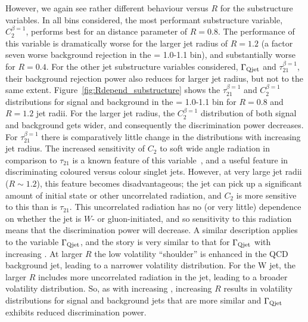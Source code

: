However, we again see rather
different behaviour versus $R$ for the substructure variables. In all \pt bins
considered, the most performant substructure variable, $C_2^{\beta=1}$,
performs best for an \antikt distance parameter of $R=0.8$. The
performance of this variable is dramatically worse for the larger jet
radius of $R=1.2$ (a factor seven worse background rejection in
the \pt = 1.0-1.1 \TeV bin), and substantially worse for $R=0.4$. For the other
jet substructure variables considered, $\Gamma_{\rm Qjet}$ and
$\tau_{21}^{\beta=1}$, their background rejection
power also reduces for larger jet radius, but not to the same
extent. Figure~\ref{fig:Rdepend_substructure} shows the
$\tau_{21}^{\beta=1}$ and $C_2^{\beta=1}$ distributions for signal and
background in the \pt = 1.0-1.1 \TeV bin for $R=0.8$ and $R=1.2$ jet
radii. For the larger jet radius, the
$C_2^{\beta=1}$  distribution of both signal and background gets wider,
and consequently the discrimination power decreases. For
$\tau_{21}^{\beta=1}$ there is comparatively little change in the distributions
with increasing jet radius. The increased sensitivity of $C_{2}$ to
soft wide angle radiation in comparison to $\tau_{21}$ is a known
feature of this variable~\cite{Larkoski:2013eya}, and a useful feature
in discriminating coloured versus colour singlet jets. However, at
very large jet radii ($R\sim1.2$), this feature becomes
disadvantageous; the jet can pick up a significant amount of initial
state or other uncorrelated radiation, and $C_{2}$ is more sensitive
to this than is $\tau_{21}$.  This uncorrelated radiation has no (or
very little) dependence on whether the jet is $W$- or gluon-initiated, and so sensitivity to this radiation means that the 
discrimination power will decrease. A similar description applies to the 
variable $\Gamma_{\rm Qjet}$, and the story is very similar to that
for $\Gamma_{\rm Qjet}$ with increasing \pt.  At larger $R$ the low volatility ``shoulder'' is enhanced in the
QCD background jet, leading to a narrower volatility distribution.  For the W jet,
the larger $R$ includes more uncorrelated radiation in the jet, leading to a broader
volatility distribution.  So, as with increasing \pt, increasing $R$ results in volatility distributions
for signal and background jets that are more similar and $\Gamma_{\rm Qjet}$ exhibits
reduced discrimination power.

